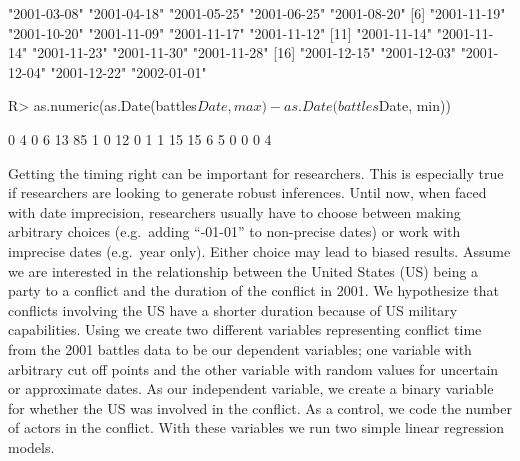 \documentclass[
]{jss}
\begin{document}
\begin{CodeChunk}
\begin{CodeOutput}
 [1] "2001-03-08" "2001-04-18" "2001-05-25" "2001-06-25" "2001-08-20"
 [6] "2001-11-19" "2001-10-20" "2001-11-09" "2001-11-17" "2001-11-12"
[11] "2001-11-14" "2001-11-14" "2001-11-23" "2001-11-30" "2001-11-28"
[16] "2001-12-15" "2001-12-03" "2001-12-04" "2001-12-22" "2002-01-01"
\end{CodeOutput}
\begin{CodeInput}
R> as.numeric(as.Date(battles$Date, max) - as.Date(battles$Date, min))
\end{CodeInput}
\begin{CodeOutput}
 [1]  0  4  0  6 13 85  1  0 12  0  1  1 15 15  6  5  0  0  0  4
\end{CodeOutput}
\end{CodeChunk}

Getting the timing right can be important for researchers. This is
especially true if researchers are looking to generate robust
inferences. Until now, when faced with date imprecision, researchers
usually have to choose between making arbitrary choices (e.g.~adding
``-01-01'' to non-precise dates) or work with imprecise dates (e.g.~year
only). Either choice may lead to biased results. Assume we are
interested in the relationship between the United States (US) being a
party to a conflict and the duration of the conflict in 2001. We
hypothesize that conflicts involving the US have a shorter duration
because of US military capabilities. Using  we create
two different variables representing conflict time from the 2001 battles
data to be our dependent variables; one variable with arbitrary cut off
points and the other variable with random values for uncertain or
approximate dates. As our independent variable, we create a binary
variable for whether the US was involved in the conflict. As a control,
we code the number of actors in the conflict. With these variables we
run two simple linear regression models.
\end{document}
